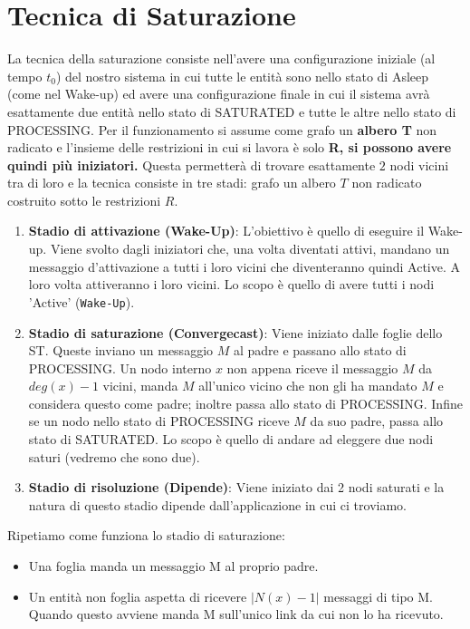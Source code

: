 \section{Tecnica di Saturazione}
La tecnica della saturazione consiste nell'avere una configurazione iniziale (al
tempo $t_0$) del nostro sistema in cui tutte le entità sono nello stato di
Asleep (come nel Wake-up) ed avere una configurazione finale in cui il sistema
avrà esattamente due entità nello stato di SATURATED e tutte le altre nello
stato di PROCESSING. Per il funzionamento si assume come grafo un \textbf{albero
    T} non radicato e l'insieme delle restrizioni in cui si lavora è solo \textbf{R,
    si possono avere quindi più iniziatori.} Questa permetterà di trovare
esattamente $2$ nodi vicini tra di loro e la tecnica consiste in tre stadi:
grafo un albero $T$ non radicato costruito sotto le restrizioni $R$.
\begin{enumerate}
    \item \textbf{Stadio di attivazione (Wake-Up)}: L'obiettivo è quello di
          eseguire il Wake-up. Viene svolto dagli iniziatori che, una volta diventati
          attivi, mandano un messaggio d'attivazione a tutti i loro vicini che
          diventeranno quindi Active. A loro volta attiveranno i loro vicini. Lo scopo è
          quello di avere tutti i nodi 'Active' (\texttt{Wake-Up}).
    \item \textbf{Stadio di saturazione (Convergecast)}: Viene iniziato dalle
          foglie dello ST. Queste inviano un messaggio $M$ al padre e passano allo stato
          di PROCESSING. Un nodo interno $x$ non appena riceve il messaggio $M$ da
          $deg(x) -1$ vicini, manda $M$ all'unico vicino che non gli ha mandato $M$ e
          considera questo come padre; inoltre passa allo stato di PROCESSING. Infine se
          un nodo nello stato di PROCESSING riceve $M$ da suo padre, passa allo stato di
          SATURATED. Lo scopo è quello di andare ad eleggere due nodi saturi (vedremo
          che sono due).
    \item \textbf{Stadio di risoluzione (Dipende)}: Viene iniziato dai 2 nodi
          saturati e la natura di questo stadio dipende dall'applicazione in cui
          ci troviamo.
\end{enumerate}
Ripetiamo come funziona lo stadio di saturazione:
\begin{itemize}
    \item Una foglia manda un messaggio M al proprio padre.
    \item Un entità non foglia aspetta di ricevere $|N(x)-1|$ messaggi di tipo M.
          Quando questo avviene manda M sull'unico link da cui non lo ha ricevuto.
\end{itemize}
